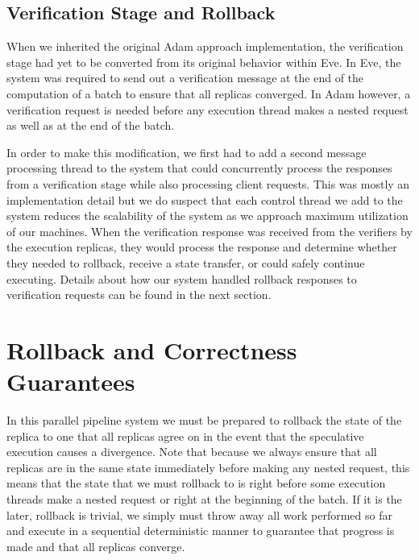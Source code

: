 \documentclass[11pt, oneside]{report}
\begin{document}
\subsection{Verification Stage and Rollback}

When we inherited the original Adam approach implementation, the verification stage had yet to be converted from its original behavior within Eve. In Eve, the system was required to send out a verification message at the end of the computation of a batch to ensure that all replicas converged. In Adam however, a verification request is needed before any execution thread makes a nested request as well as at the end of the batch.

In order to make this modification, we first had to add a second message processing thread to the system that could concurrently process the responses from a verification stage while also processing client requests. This was mostly an implementation detail but we do suspect that each control thread we add to the system reduces the scalability of the system as we approach maximum utilization of our machines. When the verification response was received from the verifiers by the execution replicas, they would process the response and determine whether they needed to rollback, receive a state transfer, or could safely continue executing. Details about how our system handled rollback responses to verification requests can be found in the next section.

\section{Rollback and Correctness Guarantees}

In this parallel pipeline system we must be prepared to rollback the state of the replica to one that all replicas agree on in the event that the speculative execution causes a divergence. Note that because we always ensure that all replicas are in the same state immediately before making any nested request, this means that the state that we must rollback to is right before some execution threads make a nested request or right at the beginning of the batch. If it is the later, rollback is trivial, we simply must throw away all work performed so far and execute in a sequential deterministic manner to guarantee that progress is made and that all replicas converge.
\end{document}
